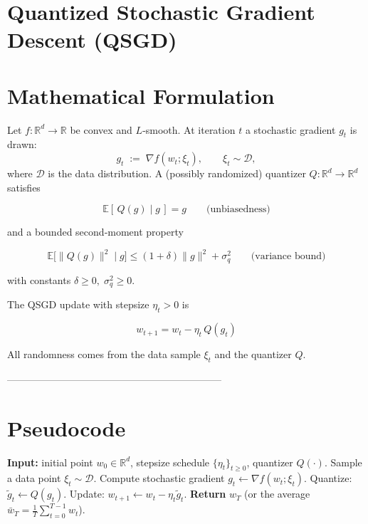 \documentclass{article}
\newcommand{\E}{\mathbb{E}}
\newcommand{\R}{\mathbb{R}}
\begin{document}
\section*{Quantized Stochastic Gradient Descent (QSGD)}

\section*{Mathematical Formulation}
Let $f:\R^{d}\rightarrow\R$ be convex and $L$‑smooth.  
At iteration $t$ a stochastic gradient $g_{t}$ is drawn:
\[
g_{t}\;:=\;\nabla f(w_{t};\xi_{t}),\qquad \xi_{t}\sim\mathcal{D},
\]
where $\mathcal{D}$ is the data distribution.  
A (possibly randomized) quantizer $Q:\R^{d}\rightarrow\R^{d}$ satisfies  

\[
\boxed{\E[\,Q(g)\mid g\,]=g}\qquad\text{(unbiasedness)}\tag{1}
\]

and a bounded second‑moment property  

\[
\boxed{\E\!\big[\|Q(g)\|^{2}\mid g\big]\le (1+\delta)\|g\|^{2}+ \sigma_{q}^{2}}\qquad\text{(variance bound)}\tag{2}
\]

with constants $\delta\ge0,\;\sigma_{q}^{2}\ge0$.  

The QSGD update with stepsize $\eta_{t}>0$ is  

\[
\boxed{w_{t+1}=w_{t}-\eta_{t}\,Q(g_{t})}\tag{3}
\]

All randomness comes from the data sample $\xi_{t}$ and the quantizer $Q$.

-----------------------------------------------------------------
\section*{Pseudocode}
\begin{algorithm}[H]
\caption{Quantized Stochastic Gradient Descent}
\begin{algorithmic}[1]
\STATE \textbf{Input:} initial point $w_{0}\in\R^{d}$, stepsize schedule $\{\eta_{t}\}_{t\ge0}$, quantizer $Q(\cdot)$.
    \STATE Sample a data point $\xi_{t}\sim\mathcal{D}$.
    \STATE Compute stochastic gradient $g_{t}\gets\nabla f(w_{t};\xi_{t})$.
    \STATE Quantize: $\tilde g_{t}\gets Q(g_{t})$.
    \STATE Update: $w_{t+1}\gets w_{t}-\eta_{t}\tilde g_{t}$.
\ENDFOR
\STATE \textbf{Return} $w_{T}$ (or the average $\bar w_{T}=\tfrac1T\sum_{t=0}^{T-1}w_{t}$).
\end{algorithmic}
\end{algorithm}
\end{document}
